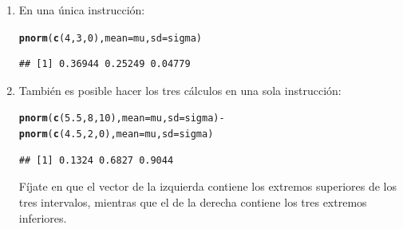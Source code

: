 \documentclass[10pt,a4paper]{article}\usepackage[]{graphicx}\usepackage[]{color}
\makeatletter
\newcommand{\hlnum}[1]{\textcolor[rgb]{0.686,0.059,0.569}{#1}}%
\newcommand{\hlopt}[1]{\textcolor[rgb]{0,0,0}{#1}}%
\newcommand{\hlstd}[1]{\textcolor[rgb]{0.345,0.345,0.345}{#1}}%
\newcommand{\hlkwc}[1]{\textcolor[rgb]{0.333,0.667,0.333}{#1}}%
\newcommand{\hlkwd}[1]{\textcolor[rgb]{0.737,0.353,0.396}{\textbf{#1}}}%
\newenvironment{kframe}{%
 \def\at@end@of@kframe{}%
 \ifinner\ifhmode%
  \def\at@end@of@kframe{\end{minipage}}%
  \begin{minipage}{\columnwidth}%
 \fi\fi%
 \def\FrameCommand##1{\hskip\@totalleftmargin \hskip-\fboxsep
 \colorbox{shadecolor}{##1}\hskip-\fboxsep
     \hskip-\linewidth \hskip-\@totalleftmargin \hskip\columnwidth}%
 \MakeFramed {\advance\hsize-\width
   \@totalleftmargin\z@ \linewidth\hsize
   \@setminipage}}%
 {\par\unskip\endMakeFramed%
 \at@end@of@kframe}
\newenvironment{knitrout}{}{} %
\newcounter{cont01}
\makeatother
\begin{document}
\begin{enumerate}
\begin{enumerate}
          \item  En una única instrucción:
\begin{knitrout}
\color{fgcolor}\begin{kframe}
\begin{alltt}
  \hlkwd{pnorm}\hlstd{(}\hlkwd{c}\hlstd{(}\hlnum{4}\hlstd{,} \hlnum{3}\hlstd{,} \hlnum{0}\hlstd{),} \hlkwc{mean}\hlstd{=mu,} \hlkwc{sd}\hlstd{=sigma)}
\end{alltt}
\begin{verbatim}
## [1] 0.36944 0.25249 0.04779
\end{verbatim}
\end{kframe}
\end{knitrout}

          \item También es posible hacer los tres cálculos en una sola instrucción:
\begin{knitrout}
\color{fgcolor}\begin{kframe}
\begin{alltt}
  \hlkwd{pnorm}\hlstd{(}\hlkwd{c}\hlstd{(}\hlnum{5.5}\hlstd{,} \hlnum{8}\hlstd{,} \hlnum{10}\hlstd{),} \hlkwc{mean}\hlstd{=mu,} \hlkwc{sd}\hlstd{=sigma)} \hlopt{-} \hlkwd{pnorm}\hlstd{(}\hlkwd{c}\hlstd{(}\hlnum{4.5}\hlstd{,} \hlnum{2}\hlstd{,} \hlnum{0}\hlstd{),} \hlkwc{mean}\hlstd{=mu,} \hlkwc{sd}\hlstd{=sigma)}
\end{alltt}
\begin{verbatim}
## [1] 0.1324 0.6827 0.9044
\end{verbatim}
\end{kframe}
\end{knitrout}
          Fíjate en que el vector de la izquierda contiene los extremos superiores de los tres intervalos, mientras que el de la derecha contiene los tres extremos inferiores.

%



\end{enumerate}
\end{enumerate}
\end{document}
